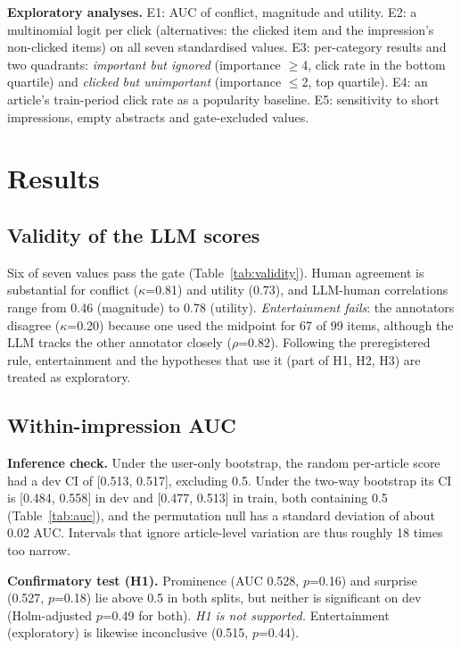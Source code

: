 \textbf{Exploratory analyses.} E1: AUC of conflict, magnitude and utility. E2: a multinomial logit per click (alternatives: the clicked item and the impression's non-clicked items) on all seven standardised values. E3: per-category results and two quadrants: \emph{important but ignored} (importance $\ge$4, click rate in the bottom quartile) and \emph{clicked but unimportant} (importance $\le$2, top quartile). E4: an article's train-period click rate as a popularity baseline. E5: sensitivity to short impressions, empty abstracts and gate-excluded values.

\section{Results}
\subsection{Validity of the LLM scores}

Six of seven values pass the gate (Table~\ref{tab:validity}). Human agreement is substantial for conflict ($\kappa$=0.81) and utility (0.73), and LLM-human correlations range from 0.46 (magnitude) to 0.78 (utility). \emph{Entertainment fails}: the annotators disagree ($\kappa$=0.20) because one used the midpoint for 67 of 99 items, although the LLM tracks the other annotator closely ($\rho$=0.82). Following the preregistered rule, entertainment and the hypotheses that use it (part of H1, H2, H3) are treated as exploratory.

\subsection{Within-impression AUC}

\textbf{Inference check.} Under the user-only bootstrap, the random per-article score had a dev CI of [0.513, 0.517], excluding 0.5. Under the two-way bootstrap its CI is [0.484, 0.558] in dev and [0.477, 0.513] in train, both containing 0.5 (Table~\ref{tab:auc}), and the permutation null has a standard deviation of about 0.02 AUC. Intervals that ignore article-level variation are thus roughly 18 times too narrow.

\textbf{Confirmatory test (H1).} Prominence (AUC 0.528, $p$=0.16) and surprise (0.527, $p$=0.18) lie above 0.5 in both splits, but neither is significant on dev (Holm-adjusted $p$=0.49 for both). \emph{H1 is not supported.} Entertainment (exploratory) is likewise inconclusive (0.515, $p$=0.44).

